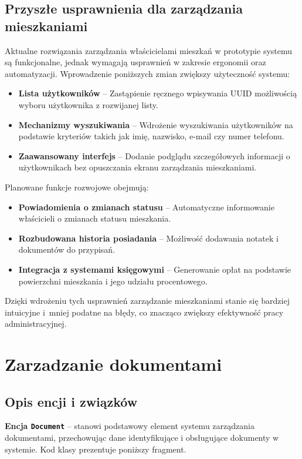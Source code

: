 \subsection{Przyszłe usprawnienia dla zarządzania mieszkaniami}

Aktualne rozwiązania zarządzania właścicielami mieszkań w prototypie systemu są funkcjonalne, jednak wymagają usprawnień w zakresie ergonomii oraz automatyzacji. Wprowadzenie poniższych zmian zwiększy użyteczność systemu:
\begin{itemize}
    \item \textbf{Lista użytkowników} -- Zastąpienie ręcznego wpisywania UUID możliwością wyboru użytkownika z rozwijanej listy.
    \item \textbf{Mechanizmy wyszukiwania} -- Wdrożenie wyszukiwania użytkowników na podstawie kryteriów takich jak imię, nazwisko, e-mail czy numer telefonu.
    \item \textbf{Zaawansowany interfejs} -- Dodanie podglądu szczegółowych informacji o użytkownikach bez opuszczania ekranu zarządzania mieszkaniami.
\end{itemize}

\noindent Planowane funkcje rozwojowe obejmują:
\begin{itemize}
    \item \textbf{Powiadomienia o zmianach statusu} -- Automatyczne informowanie właścicieli o zmianach statusu mieszkania.
    \item \textbf{Rozbudowana historia posiadania} -- Możliwość dodawania notatek i dokumentów do przypisań.
    \item \textbf{Integracja z systemami księgowymi} -- Generowanie opłat na podstawie powierzchni mieszkania i jego udziału procentowego.
\end{itemize}

Dzięki wdrożeniu tych usprawnień zarządzanie mieszkaniami stanie się bardziej intuicyjne i~mniej podatne na błędy, co znacząco zwiększy efektywność pracy administracyjnej.

\section{Zarzadzanie dokumentami}

\subsection{Opis encji i związków}

\textbf{Encja \texttt{Document}} -- stanowi podstawowy element systemu zarządzania dokumentami, przechowując dane identyfikujące i obsługujące dokumenty w systemie. Kod klasy prezentuje poniższy fragment.

